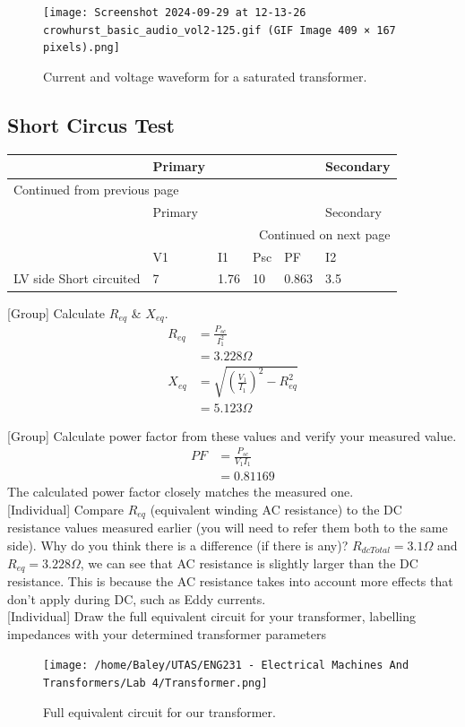 \documentclass[11pt]{article}
\begin{document}
\begin{FIGURE}
\begin{figure}[H]
\centering
\texttt{[image: Screenshot 2024-09-29 at 12-13-26 crowhurst\_basic\_audio\_vol2-125.gif (GIF Image 409 × 167 pixels).png]}
\caption{Current and voltage waveform for a saturated transformer.}
\end{figure}
\end{FIGURE}
\subsection{Short Circus Test}
\label{sec:orgef630ea}
\begin{longtable}{|l|l|l|l|l|l|}
\hline
 & Primary &  &  &  & Secondary\\
\hline
\endfirsthead
\multicolumn{6}{l}{Continued from previous page} \\
\hline

 & Primary &  &  &  & Secondary \\

\hline
\endhead
\hline\multicolumn{6}{r}{Continued on next page} \\
\endfoot
\endlastfoot
\hline
 & V1 & I1 & Psc & PF & I2\\
\hline
LV side Short circuited & 7 & 1.76 & 10 & 0.863 & 3.5\\
\hline
\end{longtable}

{[}Group] Calculate \(R_{eq}\) \& \(X_{eq}\).
\begin{align*}
R_{eq}&=\frac{P_{sc}}{I_1^2} \\
&=3.228\Omega \\
X_{eq}&=\sqrt{\left(\frac{V_1}{I_1}\right)^2-R_{eq}^{2}} \\
&=5.123\Omega
\end{align*}

{[}Group] Calculate power factor from these values and verify your measured value.
\begin{align*}
PF&=\frac{P_{sc}}{V_1I_1} \\
&=0.81169
\end{align*}
The calculated power factor closely matches the measured one. \\
{[}Individual] Compare \(R_{eq}\) (equivalent winding AC resistance) to the DC resistance values measured earlier (you will need to refer them both to the same side). Why do you think there is a difference (if there is any)?
\(R_{dcTotal}=3.1\Omega\) and \(R_{eq}=3.228\Omega\), we can see that AC resistance is slightly larger than the DC resistance. This is because the AC resistance takes into account more effects that don't apply during DC, such as Eddy currents. \\
{[}Individual] Draw the full equivalent circuit for your transformer, labelling impedances with your determined transformer parameters
\begin{FIGURE}
\begin{figure}[H]
\centering
\texttt{[image: /home/Baley/UTAS/ENG231 - Electrical Machines And Transformers/Lab 4/Transformer.png]}
\caption{Full equivalent circuit for our transformer.}
\end{figure}
\end{FIGURE}
\end{document}
